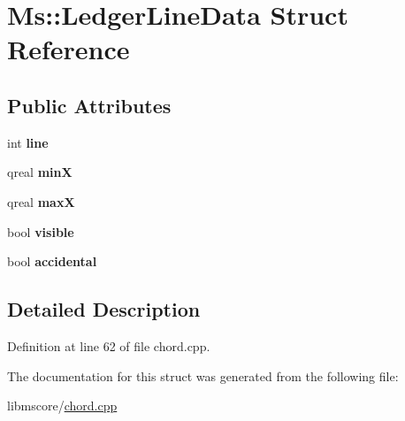 \hypertarget{struct_ms_1_1_ledger_line_data}{}\section{Ms\+:\+:Ledger\+Line\+Data Struct Reference}
\label{struct_ms_1_1_ledger_line_data}
\subsection*{Public Attributes}
\begin{DoxyCompactItemize}
\item 
\mbox{\label{struct_ms_1_1_ledger_line_data_a6679c7fddddebc542fe64e466c8df349}} 
int {\bfseries line}
\item 
\mbox{\label{struct_ms_1_1_ledger_line_data_a63b3647107d7d7977e4976243f4c23e9}} 
qreal {\bfseries minX}
\item 
\mbox{\label{struct_ms_1_1_ledger_line_data_a1d5cea4e9162e1cf889e48f5c818e433}} 
qreal {\bfseries maxX}
\item 
\mbox{\label{struct_ms_1_1_ledger_line_data_ad9515c025dc446064adecd7056116d07}} 
bool {\bfseries visible}
\item 
\mbox{\label{struct_ms_1_1_ledger_line_data_a7f8a27bbe81d4c6e934754e049a438af}} 
bool {\bfseries accidental}
\end{DoxyCompactItemize}


\subsection{Detailed Description}


Definition at line 62 of file chord.\+cpp.



The documentation for this struct was generated from the following file\+:\begin{DoxyCompactItemize}
\item 
libmscore/\hyperlink{chord_8cpp}{chord.\+cpp}\end{DoxyCompactItemize}
